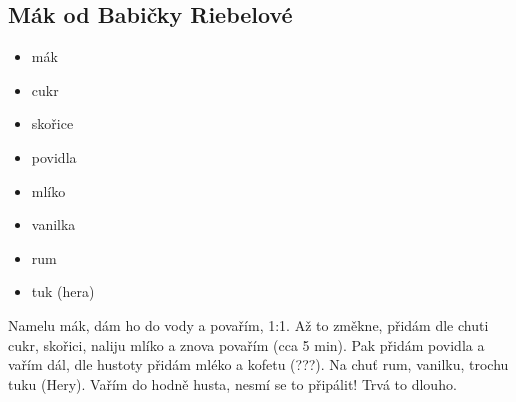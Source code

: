 \documentclass[10pt,a4paper]{article}
\newenvironment{myitemize}
{ \begin{itemize}
    \setlength{\itemsep}{0pt}
    \setlength{\parskip}{0pt}
    \setlength{\parsep}{0pt}     }
{ \end{itemize}                  }
\begin{document}
\subsection{Mák od Babičky Riebelové}
\begin{minipage}[t]{0,5\textwidth}
\begin{myitemize} 
\item mák
\item cukr
\item skořice
\item povidla
\item mlíko
\item vanilka
\item rum
\item tuk (hera)
\end{myitemize}
\end{minipage}
\begin{minipage}[t]{0,5\textwidth}
Namelu mák, dám ho do vody a povařím, 1:1. Až to změkne, přidám dle chuti cukr, skořici, naliju mlíko a znova povařím (cca 5 min). Pak přidám povidla a vařím dál, dle hustoty přidám mléko a kofetu (???). Na chuť rum, vanilku, trochu tuku (Hery). Vařím do hodně husta, nesmí se to připálit! Trvá to dlouho. 
\end{minipage}
\end{document}
